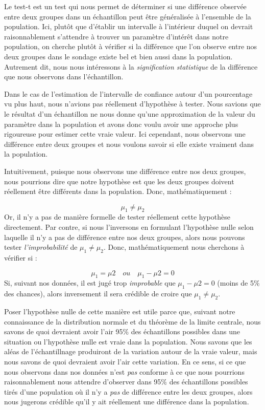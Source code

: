 \documentclass[
]{book}
\begin{document}
Le test-t est un test qui nous permet de déterminer si une différence observée entre deux groupes dans un échantillon peut être généralisée à l'ensemble de la population. Ici, plutôt que d'établir un intervalle à l'intérieur duquel on devrait raisonnablement s'attendre à trouver un paramètre d'intérêt dans notre population, on cherche plutôt à vérifier si la différence que l'on observe entre nos deux groupes dans le sondage existe bel et bien aussi dans la population. Autrement dit, nous nous intéressons à la \emph{signification statistique} de la différence que nous observons dans l'échantillon.

Dans le cas de l'estimation de l'intervalle de confiance autour d'un pourcentage vu plus haut, nous n'avions pas réellement d'hypothèse à tester. Nous savions que le résultat d'un échantillon ne nous donne qu'une approximation de la valeur du paramètre dans la population et avons donc voulu avoir une approche plus rigoureuse pour estimer cette vraie valeur. Ici cependant, nous observons une différence entre deux groupes et nous voulons savoir si elle existe vraiment dans la population.

Intuitivement, puisque nous observons une différence entre nos deux groupes, nous pourrions dire que notre hypothèse est que les deux groupes doivent réellement être différents dans la population. Donc, mathématiquement :

\[\mu_1 \neq \mu_2\]
Or, il n'y a pas de manière formelle de tester réellement cette hypothèse directement. Par contre, si nous l'inversons en formulant l'hypothèse nulle selon laquelle il n'y a pas de différence entre nos deux groupes, alors nous pouvons tester \emph{l'improbabilité} de \(\mu_1 \neq \mu_2\). Donc, mathématiquement nous cherchons à vérifier si :

\[\mu_1=\mu2 \quad ou \quad  \mu_1-\mu2=0\]
Si, suivant nos données, il est jugé trop \emph{improbable} que \(\mu_1-\mu2=0\) (moins de 5\% des chances), alors inversement il sera crédible de croire que \(\mu_1 \neq \mu_2\).

Poser l'hypothèse nulle de cette manière est utile parce que, suivant notre connaissance de la distribution normale et du théorème de la limite centrale, nous savons de quoi devraient avoir l'air 95\% des échantillons possibles dans une situation ou l'hypothèse nulle est vraie dans la population. Nous savons que les aléas de l'échantillnage produiront de la variation autour de la vraie valeur, mais nous savons de quoi devraient avoir l'air cette variation. En ce sens, si ce que nous observons dans nos données n'est \emph{pas} conforme à ce que nous pourrions raisonnablement nous attendre d'observer dans 95\% des échantillons possibles tirés d'une population où il n'y a \emph{pas} de différence entre les deux groupes, alors nous jugerons crédible qu'il y ait réellement une différence dans la population.
\end{document}
